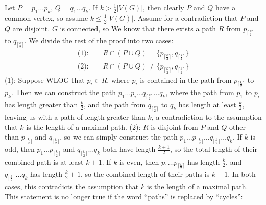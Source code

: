 \documentclass[11pt]{article}
\begin{document}
\section{} %
Let $P=p_1\ldots p_k$, $Q=q_1\ldots q_k$. If $k>\frac{1}{2}|V(G)|$, then clearly
$P$ and $Q$ have a common vertex, so assume $k\le\frac{1}{2}|V(G)|$.
\newline
\newline
Assume for a contradiction that $P$ and $Q$ are disjoint. $G$ is connected, so
We know that there exists a path $R$ from $p_{\lceil\frac{k}{2}\rceil}$ to
$q_{\lceil\frac{k}{2}\rceil}$. We divide the rest of the proof into two cases:
\begin{align*}
\textrm{(1):}\qquad R\cap(P\cup Q)=\{p_{\lceil\frac{k}{2}\rceil},q_{\lceil\frac{k}{2}\rceil}\}\\
\textrm{(2):}\qquad R\cap(P\cup Q)\neq\{p_{\lceil\frac{k}{2}\rceil},q_{\lceil\frac{k}{2}\rceil}\}
\end{align*}
\newline
\newline
(1): Suppose WLOG that $p_i\in R$, where $p_i$ is contained in the path from
$p_{\lceil\frac{k}{2}\rceil}$ to $p_k$. Then we can construct the path
$p_1\ldots p_i\ldots q_{\lceil\frac{k}{2}\rceil}\ldots q_k$, where the path from $p_1$ to $p_i$
has length greater than $\frac{k}{2}$, and the path from $q_{\lceil\frac{k}{2}\rceil}$ to
$q_k$ has length at least $\frac{k}{2}$, leaving us with a path of length greater
than $k$, a contradiction to the assumption that $k$ is the length of a maximal
path.
\newline
\newline
(2): $R$ is disjoint from $P$ and $Q$ other than $p_{\lceil\frac{k}{2}\rceil}$ and
$q_{\lceil\frac{k}{2}\rceil}$, so we can simply construct the path
$p_1\ldots p_{\lceil\frac{k}{2}\rceil}\ldots q_{\lceil\frac{k}{2}\rceil}\ldots q_k$. If $k$ is odd, then
$p_1\ldots p_{\lceil\frac{k}{2}\rceil}$  and $q_{\lceil\frac{k}{2}\rceil}\ldots q_k$ both have length
$\frac{k+1}{2}$, so the total length of their combined path is at least $k+1$.
If $k$ is even, then $p_1\ldots p_{\lceil\frac{k}{2}\rceil}$ has length $\frac{k}{2}$,
and $q_{\lceil\frac{k}{2}\rceil}\ldots q_k$ has length $\frac{k}{2}+1$, so the
combined length of their paths is $k+1$. In both cases, this contradicts the
assumption that $k$ is the length of a maximal path.
\newline
\newline
This statement is no longer true if the word ``paths'' is replaced by ``cycles'':
\newline
\newline
{}
\end{document}
